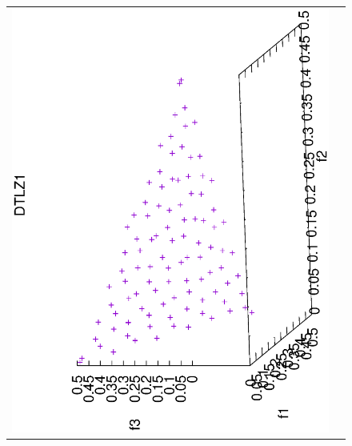 \begin{figure}[H]
\begin{tabular}{cc}
  \includegraphics[scale=0.3, angle=-90,origin=c]{Figures_Chapter7/Results_Chapter4/Summary_Representative/VSD-MOEA-D/DTLZ1.eps}  \\

\end{tabular}
\end{figure}

